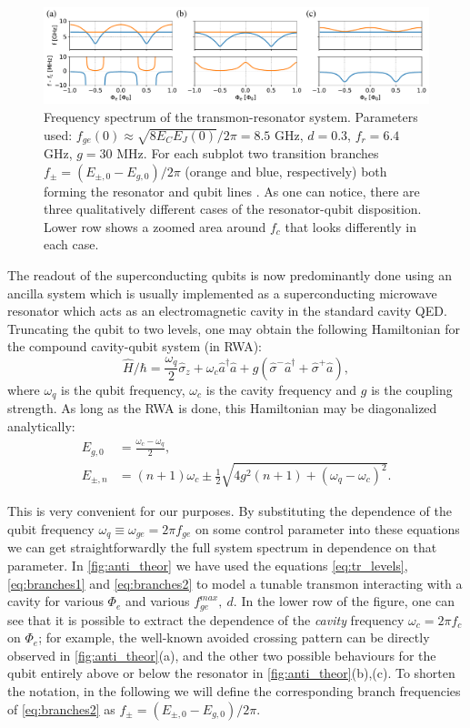 \documentclass[%
 aip,
 amsmath,amssymb,
 reprint,%
]{revtex4-1}
\begin{document}
\begin{figure}
\centering
\includegraphics[width=\textwidth]{anti_theor}
\caption{Frequency spectrum of the transmon-resonator system. Parameters used: $f_{ge}(0) \approx \sqrt{8E_C E_J(0)}/2\pi = 8.5$ GHz, $d=0.3$, $f_r=6.4$ GHz, $g = 30$ MHz. For each subplot two transition branches $f_{\pm} = (E_{\pm,0} - E_{g,0})/2\pi$ (orange and blue, respectively) both forming the resonator and qubit lines . As one can notice, there are three qualitatively different cases of the resonator-qubit disposition. Lower row shows a zoomed area around $f_c$ that looks differently in each case.}
\label{fig:anti_theor}
\end{figure}

The readout of the superconducting qubits is now predominantly done using an ancilla system which is usually implemented as a superconducting microwave resonator which acts as an electromagnetic cavity in the standard cavity QED. Truncating the qubit to two levels, one may obtain the following Hamiltonian for the compound cavity-qubit system (in RWA):
\begin{equation}
\hat H/\hbar = \frac{\omega_q}{2} \hat \sigma_z + \omega_c \hat a^\dagger \hat a + g(\hat \sigma^- \hat a^\dagger + \hat \sigma^+ \hat a),
\end{equation}
where $\omega_q$ is the qubit frequency, $\omega_c$ is the cavity frequency and $g$ is the coupling strength. As long as the RWA is done, this Hamiltonian may be diagonalized analytically\cite{blais2004}:
\begin{align}
E_{g, 0} &= \frac{\omega_c - \omega_q}{2},\label{eq:branches1}
 \\
E_{\pm, n} &= (n+1)\omega_c \pm \frac{1}{2}\sqrt{4g^2(n+1)+(\omega_q-\omega_c)^2}.
\label{eq:branches2}
\end{align}

This is very convenient for our purposes. By substituting the dependence of the qubit frequency $\omega_q \equiv \omega_{ge} = 2\pi f_{ge}$ on some control parameter into these equations we can get straightforwardly the full system spectrum in dependence on that parameter. In \autoref{fig:anti_theor} we have used the equations \eqref{eq:tr_levels}, \eqref{eq:branches1} and \eqref{eq:branches2} to model a tunable transmon interacting with a cavity for various $\Phi_e$ and various $f_{ge}^{max},\ d$. In the lower row of the figure, one can see that it is possible to extract the dependence of the \textit{cavity} frequency $\omega_c = 2\pi f_c$ on $\Phi_e$; for example, the well-known avoided crossing pattern can be directly observed in \autoref{fig:anti_theor}(a), and the other two possible behaviours for the qubit entirely above or below the resonator in \autoref{fig:anti_theor}(b),(c). To shorten the notation, in the following we will define the corresponding branch frequencies of \eqref{eq:branches2} as $f_{\pm} = ( E_{\pm,0}-E_{g,0})/2\pi$.
\end{document}
